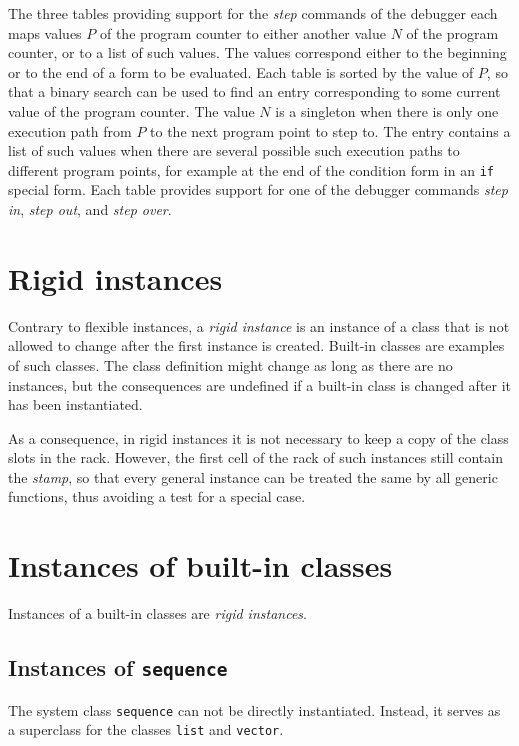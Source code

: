 The three tables providing support for the \emph{step} commands of the
debugger each maps values $P$ of the program counter to either
another value $N$ of the program counter, or to a list of such values.
The values correspond either to the beginning or to the end of a form
to be evaluated.  Each table is sorted by the value of $P$, so that a
binary search can be used to find an entry corresponding to some
current value of the program counter.  The value $N$ is a singleton
when there is only one execution path from $P$ to the next program
point to step to.  The entry contains a list of such values when there
are several possible such execution paths to different program points,
for example at the end of the condition form in an \texttt{if} special
form.  Each table provides support for one of the debugger commands
\emph{step in}, \emph{step out}, and \emph{step over}.

\section{Rigid instances}
\label{sec-data-representation-rigid-instances}

Contrary to flexible instances, a \emph{rigid instance} is an instance
of a class that is not allowed to change after the first instance is
created.  Built-in classes are examples of such classes.  The class
definition might change as long as there are no instances, but the
consequences are undefined if a built-in class is changed after it has
been instantiated.

As a consequence, in rigid instances it is not necessary to keep a
copy of the class slots in the rack.  However, the first
cell of the rack of such instances still contain the
\emph{stamp}, so that every general instance can be treated the same
by all generic functions, thus avoiding a test for a special case.

\section{Instances of built-in classes}

Instances of a built-in classes are \emph{rigid instances}.

\subsection{Instances of \texttt{sequence}}

The system class \texttt{sequence} can not be directly instantiated.
Instead, it serves as a superclass for the classes \texttt{list} and
\texttt{vector}.

